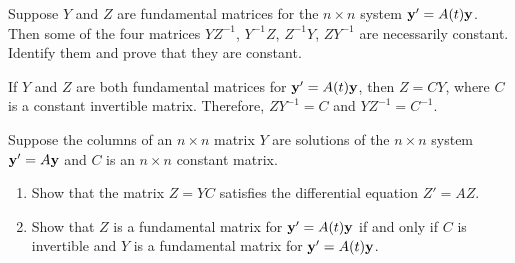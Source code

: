 \documentclass{ximera}
\begin{document}
\begin{problem}\label{exer:10.3.14}
Suppose $Y$ and $Z$ are fundamental matrices for the $n\times n$
system ${\bf y}'=A(t){\bf y}$. Then some of the four matrices
$YZ^{-1}$, $Y^{-1}Z$, $Z^{-1}Y$, $Z Y^{-1}$ are necessarily
constant. Identify them and prove that they are constant.

\begin{solution}
    If $Y$  and $Z$ are both fundamental matrices for ${\bf y}'=A(t){\bf y
}$, then $Z=CY$, where $C$ is a constant invertible matrix. Therefore,
$ZY^{-1}=C$ and $YZ^{-1}=C^{-1}$.
\end{solution}
\end{problem}

\begin{problem}\label{exer:10.3.15}
Suppose the columns of an $n\times n$ matrix $Y$ are solutions of
the $n\times n$ system ${\bf y}'=A{\bf y}$ and $C$ is an $n \times n$
constant matrix.

\begin{enumerate}
\item %
Show that the matrix $Z=YC$ satisfies the differential equation
$Z'=AZ$.

\item %
Show that $Z$ is a fundamental matrix for ${\bf y}'=A(t){\bf y}$ if
and only if $C$ is invertible and $Y$ is a fundamental matrix for
${\bf y}'=A(t){\bf y}$.
\end{enumerate}
\end{problem}
\end{document}
